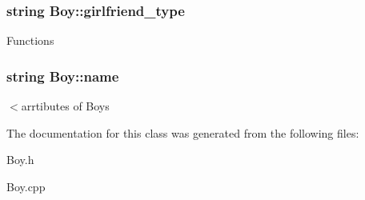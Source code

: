 \subsubsection[{\texorpdfstring{girlfriend\+\_\+type}{girlfriend_type}}]{\setlength{\rightskip}{0pt plus 5cm}string Boy\+::girlfriend\+\_\+type}\hypertarget{class_boy_a14bcd028dc32bc027173fc6b59f9b0ef}{}\label{class_boy_a14bcd028dc32bc027173fc6b59f9b0ef}
Functions 
\subsubsection[{\texorpdfstring{name}{name}}]{\setlength{\rightskip}{0pt plus 5cm}string Boy\+::name}\hypertarget{class_boy_a8649f275f6428267fad0234866c1ccfa}{}\label{class_boy_a8649f275f6428267fad0234866c1ccfa}
$<$arrtibutes of Boys 

The documentation for this class was generated from the following files\+:\begin{DoxyCompactItemize}
\item 
Boy.\+h\item 
Boy.\+cpp\end{DoxyCompactItemize}
